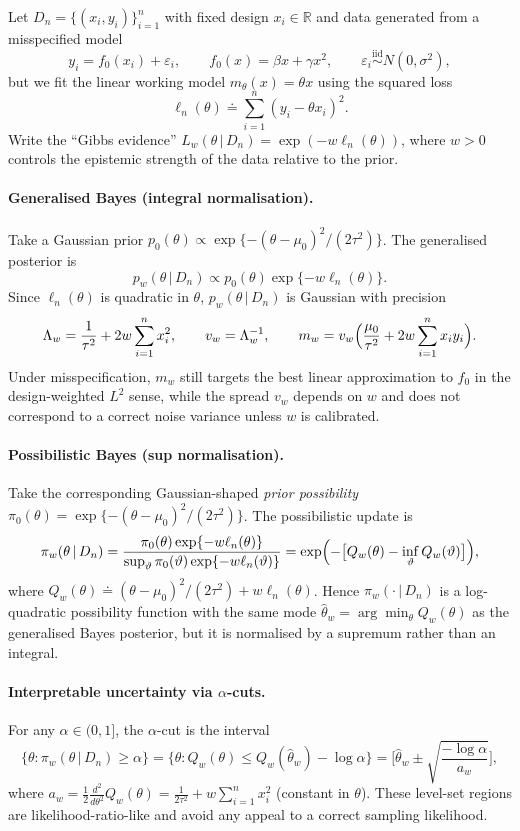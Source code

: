 \documentclass[accepted]{uai2026} %
\def\given{\,|\,}
\theoremstyle{remark}
\begin{document}
Let $D_n=\{(x_i,y_i)\}_{i=1}^n$ with fixed design $x_i\in\mathbb{R}$ and data generated from a misspecified model
\[
y_i = f_0(x_i)+\varepsilon_i,\qquad f_0(x)=\beta x+\gamma x^2,\qquad \varepsilon_i\stackrel{\text{iid}}{\sim}N(0,\sigma^2),
\]
but we fit the linear working model $m_\theta(x)=\theta x$ using the squared loss
\[
\ell_n(\theta) \doteq \sum_{i=1}^n (y_i-\theta x_i)^2.
\]
Write the ``Gibbs evidence'' $L_w(\theta\given D_n) = \exp(-w \ell_n(\theta))$, where $w>0$ controls the epistemic strength of the data relative to the prior.

\paragraph{Generalised Bayes (integral normalisation).}
Take a Gaussian prior $p_0(\theta)\propto\exp\{-(\theta-\mu_0)^2/(2\tau^2)\}$. The generalised posterior is
\[
p_w(\theta\given D_n) \propto p_0(\theta)\exp\{-w \ell_n(\theta)\}.
\]
Since $\ell_n(\theta)$ is quadratic in $\theta$, $p_w(\theta\given D_n)$ is Gaussian with precision
\[
\Lambda_w = \frac{1}{\tau^2}+2w\sum_{i=1}^n x_i^2,
\qquad
v_w = \Lambda_w^{-1},
\qquad
m_w = v_w\Bigl(\frac{\mu_0}{\tau^2}+2w\sum_{i=1}^n x_i y_i\Bigr).
\]
Under misspecification, $m_w$ still targets the best linear approximation to $f_0$ in the design-weighted $L^2$ sense, while the spread $v_w$ depends on $w$ and does not correspond to a correct noise variance unless $w$ is calibrated.

\paragraph{Possibilistic Bayes (sup normalisation).}
Take the corresponding Gaussian-shaped \emph{prior possibility} $\pi_0(\theta)=\exp\{-(\theta-\mu_0)^2/(2\tau^2)\}$. The possibilistic update is
\[
\pi_w(\theta\given D_n) = \frac{\pi_0(\theta)\exp\{-w \ell_n(\theta)\}}{\sup_{\vartheta}\pi_0(\vartheta)\exp\{-w \ell_n(\vartheta)\}}
= \exp \Bigl(-\bigl[Q_w(\theta)-\inf_{\vartheta}Q_w(\vartheta)\bigr]\Bigr),
\]
where $Q_w(\theta) \doteq (\theta-\mu_0)^2/(2\tau^2) + w \ell_n(\theta)$. Hence $\pi_w(\cdot\given D_n)$ is a log-quadratic possibility function with the same mode $\hat{\theta}_w = \arg\min_{\theta} Q_w(\theta)$ as the generalised Bayes posterior, but it is normalised by a supremum rather than an integral.

\paragraph{Interpretable uncertainty via $\alpha$-cuts.}
For any $\alpha\in(0,1]$, the $\alpha$-cut is the interval
\[
\{\theta:\pi_w(\theta\given D_n)\ge\alpha\}
= \{\theta:Q_w(\theta)\le Q_w(\hat\theta_w)-\log\alpha\}
= \biggl[\hat\theta_w\pm \sqrt{\frac{-\log\alpha}{a_w}}\biggr],
\]
where $a_w = \frac{1}{2}\frac{d^2}{d\theta^2}Q_w(\theta) = \frac{1}{2\tau^2}+w\sum_{i=1}^n x_i^2$ (constant in $\theta$). These level-set regions are likelihood-ratio-like and avoid any appeal to a correct sampling likelihood.
\end{document}
